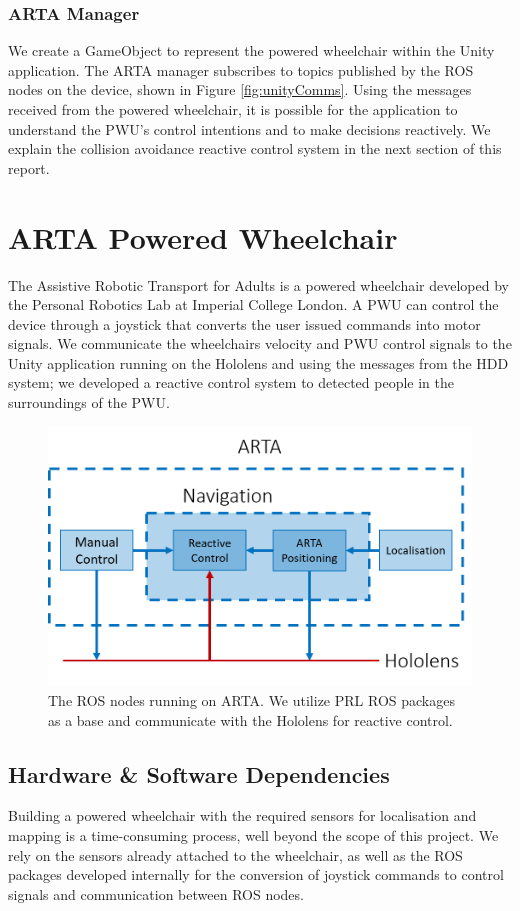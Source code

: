 \subsubsection{ARTA Manager}
We create a GameObject to represent the powered wheelchair within the Unity application. The ARTA manager subscribes to topics published by the ROS nodes on the device, shown in Figure \ref{fig:unityComms}. Using the messages received from the powered wheelchair, it is possible for the application to understand the PWU's control intentions and to make decisions reactively. We explain the collision avoidance reactive control system in the next section of this report.

\section{ARTA Powered Wheelchair}
The Assistive Robotic Transport for Adults is a powered wheelchair developed by the Personal Robotics Lab at Imperial College London. A PWU can control the device through a joystick that converts the user issued commands into motor signals. We communicate the wheelchairs velocity and PWU control signals to the Unity application running on the Hololens and using the messages from the HDD system; we developed a reactive control system to detected people in the surroundings of the PWU. 

\begin{figure}[ht]
    \centering
    \includegraphics[width=0.8\linewidth]{img/chapter5_implementation/artaSystemDiagram.png}
    \caption{The ROS nodes running on ARTA. We utilize PRL ROS packages as a base and communicate with the Hololens for reactive control.}
    \label{fig:detailedARTA}
\end{figure}


\subsection{Hardware \& Software Dependencies}
Building a powered wheelchair with the required sensors for localisation and mapping is a time-consuming process, well beyond the scope of this project. We rely on the sensors already attached to the wheelchair, as well as the ROS packages developed internally for the conversion of joystick commands to control signals and communication between ROS nodes.

